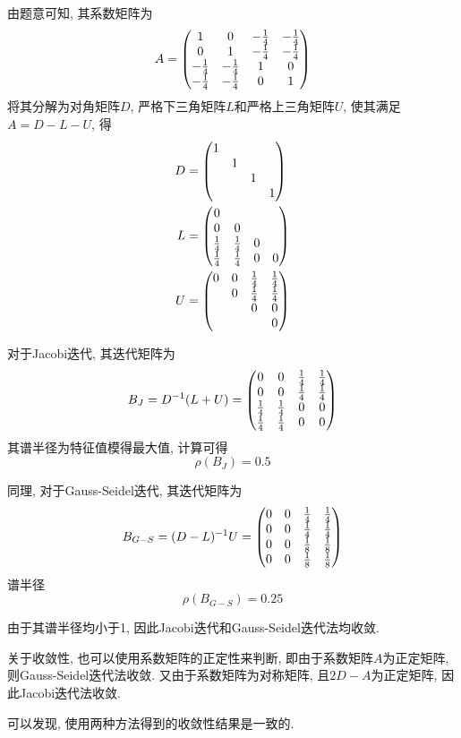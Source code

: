 \begin{solution}
    由题意可知, 其系数矩阵为
    \begin{equation*}
        A=\mqty(
            1&0&-\frac{1}{4}&-\frac{1}{4}\\
            0&1&-\frac{1}{4}&-\frac{1}{4}\\
            -\frac{1}{4}&-\frac{1}{4}&1&0\\
            -\frac{1}{4}&-\frac{1}{4}&0&1
        )
    \end{equation*}
    将其分解为对角矩阵$D$, 严格下三角矩阵$L$和严格上三角矩阵$U$, 使其满足$A=D-L-U$, 得
    \begin{align*}
        D&=\mqty(
            1&&&\\
            &1&&\\
            &&1&\\
            &&&1
        )\\
        L&=\mqty(
            0&&&\\
            0&0&&\\
            \frac{1}{4}&\frac{1}{4}&0&\\
            \frac{1}{4}&\frac{1}{4}&0&0
        )\\
        U&=\mqty(
            0&0&\frac{1}{4}&\frac{1}{4}\\
            &0&\frac{1}{4}&\frac{1}{4}\\
            &&0&0\\
            &&&0
        )
    \end{align*}

    对于Jacobi迭代, 其迭代矩阵为
    \begin{equation*}
        B_J=\inv{D}(L+U)=\mqty(
            0&0&\frac{1}{4}&\frac{1}{4}\\
            0&0&\frac{1}{4}&\frac{1}{4}\\
            \frac{1}{4}&\frac{1}{4}&0&0\\
            \frac{1}{4}&\frac{1}{4}&0&0
        )
    \end{equation*}
    其谱半径为特征值模得最大值, 计算可得
    \begin{equation*}
        \rho(B_J)=0.5
    \end{equation*}

    同理, 对于Gauss-Seidel迭代, 其迭代矩阵为
    \begin{equation*}
        B_{G-S}=\inv{(D-L)}U=\mqty(
            0&0&\frac{1}{4}&\frac{1}{4}\\
            0&0&\frac{1}{4}&\frac{1}{4}\\
            0&0&\frac{1}{8}&\frac{1}{8}\\
            0&0&\frac{1}{8}&\frac{1}{8}
        )
    \end{equation*}
    谱半径
    \begin{equation*}
        \rho(B_{G-S})=0.25
    \end{equation*}

    由于其谱半径均小于1, 因此Jacobi迭代和Gauss-Seidel迭代法均收敛.
\end{solution}

关于收敛性, 也可以使用系数矩阵的正定性来判断, 即由于系数矩阵$A$为正定矩阵, 则Gauss-Seidel迭代法收敛. 又由于系数矩阵为对称矩阵, 且$2D-A$为正定矩阵, 因此Jacobi迭代法收敛.

可以发现, 使用两种方法得到的收敛性结果是一致的.